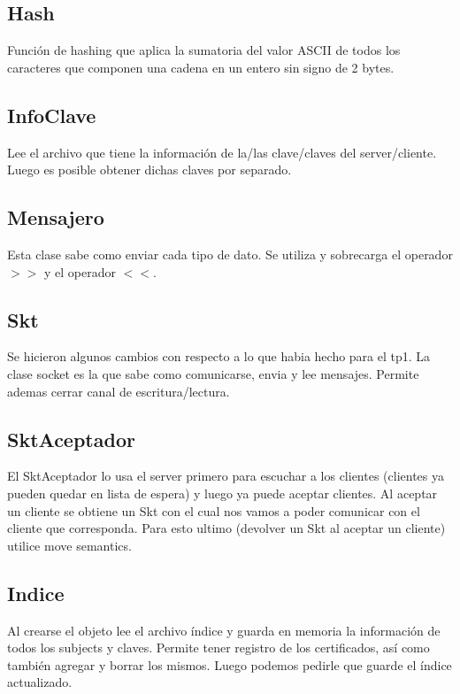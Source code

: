 \documentclass[titlepage,a4paper]{article}
\begin{document}
\subsection{Hash}
Función de hashing que aplica la sumatoria del valor ASCII de todos los caracteres que componen una cadena en un entero sin signo de 2 bytes.

\subsection{InfoClave}

Lee el archivo que tiene la información de la/las clave/claves del server/cliente. Luego es posible obtener dichas claves por separado.

\subsection{Mensajero}

Esta clase sabe como enviar cada tipo de dato. Se utiliza y sobrecarga el operador $>>$ y el operador $<<$.

\subsection{Skt}

Se hicieron algunos cambios con respecto a lo que habia hecho para el tp1. La clase socket es la que sabe como comunicarse, envia y lee mensajes. Permite ademas cerrar canal de escritura/lectura.

\subsection{SktAceptador}

El SktAceptador lo usa el server primero para escuchar a los clientes (clientes ya pueden quedar en lista de espera) y luego ya puede aceptar clientes. Al aceptar un cliente se obtiene un Skt con el cual nos vamos a poder comunicar con el cliente que corresponda. Para esto ultimo (devolver un Skt al aceptar un cliente) utilice move semantics.

\subsection{Indice}

Al crearse el objeto lee el archivo índice y guarda en memoria la información de todos los subjects y claves. Permite tener registro de los certificados, así como también agregar y borrar los mismos. Luego podemos pedirle que guarde el índice actualizado.
\end{document}
